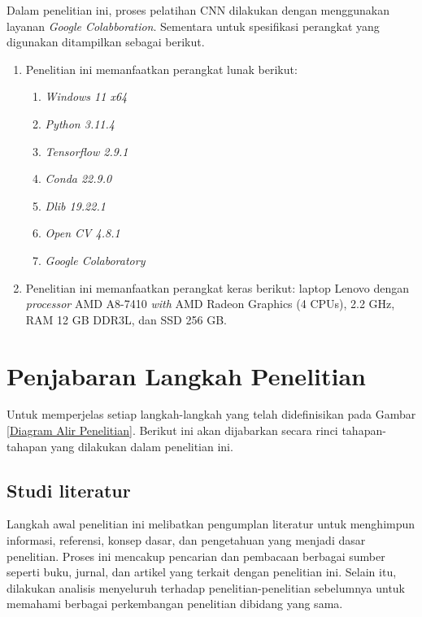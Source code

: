 Dalam penelitian ini, proses pelatihan CNN dilakukan dengan menggunakan layanan \textit{Google Colabboration}. Sementara untuk spesifikasi perangkat yang digunakan ditampilkan sebagai berikut.


    \begin{enumerate}
        \item Penelitian ini memanfaatkan perangkat lunak berikut:

        \begin{enumerate}
            \item \textit{Windows 11 x64}
            \item \textit{Python 3.11.4}
            \item \textit{Tensorflow 2.9.1}
            \item \textit{Conda 22.9.0} \item \textit {Dlib 19.22.1}
            \item \textit{Open CV 4.8.1}
            \item \textit{Google Colaboratory}
        \end{enumerate}
        
        \item Penelitian ini memanfaatkan perangkat keras berikut: laptop Lenovo dengan \textit{processor} AMD  A8-7410 \textit{with} AMD Radeon Graphics (4 CPUs),  2.2 GHz, RAM 12 GB DDR3L, dan SSD 256 GB.

    \end{enumerate}
    
\section{Penjabaran Langkah Penelitian}

    Untuk memperjelas setiap langkah-langkah yang telah didefinisikan pada Gambar \ref{Diagram Alir Penelitian}. Berikut ini akan dijabarkan secara rinci tahapan-tahapan yang dilakukan dalam penelitian ini.
    
\subsection{Studi literatur}

    Langkah awal penelitian ini melibatkan pengumplan literatur untuk menghimpun informasi, referensi, konsep dasar, dan pengetahuan yang menjadi dasar penelitian. Proses ini mencakup pencarian dan pembacaan berbagai sumber seperti buku, jurnal, dan artikel yang terkait dengan penelitian ini. Selain itu, dilakukan analisis menyeluruh terhadap penelitian-penelitian sebelumnya untuk memahami berbagai perkembangan penelitian dibidang yang sama.

